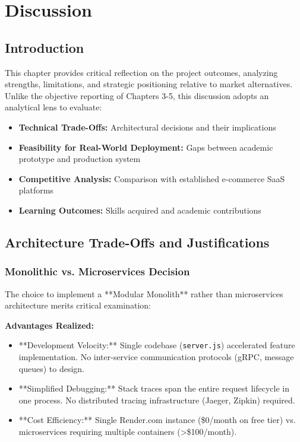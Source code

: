 
\chapter{Discussion}

\section{Introduction}

This chapter provides critical reflection on the project outcomes, analyzing strengths, limitations, and strategic positioning relative to market alternatives. Unlike the objective reporting of Chapters 3-5, this discussion adopts an analytical lens to evaluate:

\begin{itemize}
    \item \textbf{Technical Trade-Offs:} Architectural decisions and their implications
    \item \textbf{Feasibility for Real-World Deployment:} Gaps between academic prototype and production system
    \item \textbf{Competitive Analysis:} Comparison with established e-commerce SaaS platforms
    \item \textbf{Learning Outcomes:} Skills acquired and academic contributions
\end{itemize}

\section{Architecture Trade-Offs and Justifications}

\subsection{Monolithic vs. Microservices Decision}

The choice to implement a **Modular Monolith** rather than microservices architecture merits critical examination:

\textbf{Advantages Realized:}
\begin{itemize}
    \item **Development Velocity:** Single codebase (\texttt{server.js}) accelerated feature implementation. No inter-service communication protocols (gRPC, message queues) to design.
    \item **Simplified Debugging:** Stack traces span the entire request lifecycle in one process. No distributed tracing infrastructure (Jaeger, Zipkin) required.
    \item **Cost Efficiency:** Single Render.com instance (\$0/month on free tier) vs. microservices requiring multiple containers (\textgreater \$100/month).
\end{itemize}

